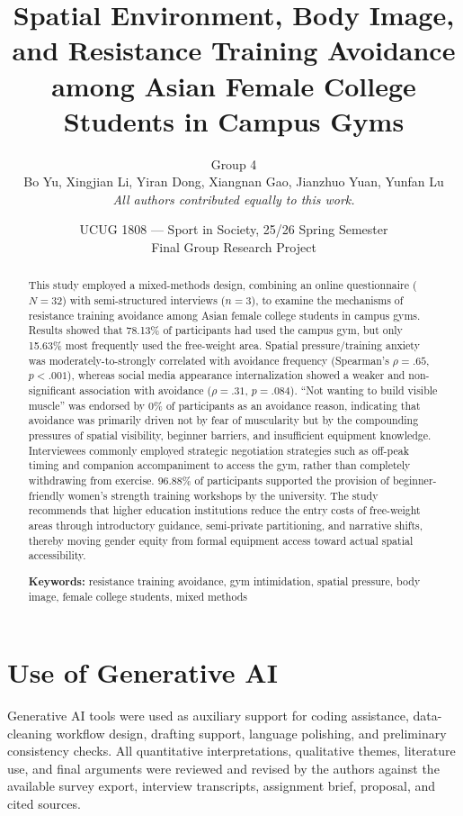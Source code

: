 \documentclass[11pt, a4paper]{article}
\title{
  Spatial Environment, Body Image, and Resistance Training Avoidance\\
  among Asian Female College Students in Campus Gyms
}
\author{
  {\small Group 4}\\[0.5em]
  {\small Bo Yu, Xingjian Li, Yiran Dong, Xiangnan Gao, Jianzhuo Yuan, Yunfan Lu}\\[0.3em]
  {\small\itshape All authors contributed equally to this work.}
}
\date{
  \small UCUG 1808 --- Sport in Society, 25/26 Spring Semester\\
  \small Final Group Research Project
}
\begin{document}
\maketitle
\thispagestyle{empty}

\begin{abstract}
This study employed a mixed-methods design, combining an online questionnaire ($N = 32$) with semi-structured interviews ($n = 3$), to examine the mechanisms of resistance training avoidance among Asian female college students in campus gyms. Results showed that 78.13\% of participants had used the campus gym, but only 15.63\% most frequently used the free-weight area. Spatial pressure/training anxiety was moderately-to-strongly correlated with avoidance frequency (Spearman's $\rho = .65$, $p < .001$), whereas social media appearance internalization showed a weaker and non-significant association with avoidance ($\rho = .31$, $p = .084$). ``Not wanting to build visible muscle'' was endorsed by 0\% of participants as an avoidance reason, indicating that avoidance was primarily driven not by fear of muscularity but by the compounding pressures of spatial visibility, beginner barriers, and insufficient equipment knowledge. Interviewees commonly employed strategic negotiation strategies such as off-peak timing and companion accompaniment to access the gym, rather than completely withdrawing from exercise. 96.88\% of participants supported the provision of beginner-friendly women's strength training workshops by the university. The study recommends that higher education institutions reduce the entry costs of free-weight areas through introductory guidance, semi-private partitioning, and narrative shifts, thereby moving gender equity from formal equipment access toward actual spatial accessibility.

\noindent\textbf{Keywords: } resistance training avoidance, gym intimidation, spatial pressure, body image, female college students, mixed methods
\end{abstract}

\newpage

\tableofcontents
\newpage








\section*{Use of Generative AI}
Generative AI tools were used as auxiliary support for coding assistance, data-cleaning workflow design, drafting support, language polishing, and preliminary consistency checks. All quantitative interpretations, qualitative themes, literature use, and final arguments were reviewed and revised by the authors against the available survey export, interview transcripts, assignment brief, proposal, and cited sources.

\printbibliography[heading=bibintoc, title={References}]
\end{document}
